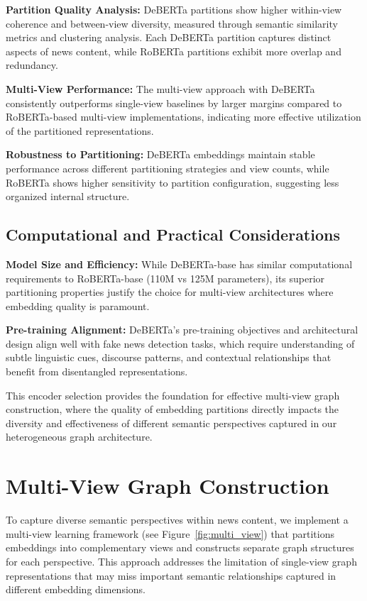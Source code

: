 \textbf{Partition Quality Analysis:} DeBERTa partitions show higher within-view coherence and between-view diversity, measured through semantic similarity metrics and clustering analysis. Each DeBERTa partition captures distinct aspects of news content, while RoBERTa partitions exhibit more overlap and redundancy.

\textbf{Multi-View Performance:} The multi-view approach with DeBERTa consistently outperforms single-view baselines by larger margins compared to RoBERTa-based multi-view implementations, indicating more effective utilization of the partitioned representations.

\textbf{Robustness to Partitioning:} DeBERTa embeddings maintain stable performance across different partitioning strategies and view counts, while RoBERTa shows higher sensitivity to partition configuration, suggesting less organized internal structure.

\subsection{Computational and Practical Considerations}

\textbf{Model Size and Efficiency:} While DeBERTa-base has similar computational requirements to RoBERTa-base (110M vs 125M parameters), its superior partitioning properties justify the choice for multi-view architectures where embedding quality is paramount.

\textbf{Pre-training Alignment:} DeBERTa's pre-training objectives and architectural design align well with fake news detection tasks, which require understanding of subtle linguistic cues, discourse patterns, and contextual relationships that benefit from disentangled representations.

This encoder selection provides the foundation for effective multi-view graph construction, where the quality of embedding partitions directly impacts the diversity and effectiveness of different semantic perspectives captured in our heterogeneous graph architecture.

\section{Multi-View Graph Construction}

To capture diverse semantic perspectives within news content, we implement a multi-view learning framework (see Figure~\ref{fig:multi_view}) that partitions embeddings into complementary views and constructs separate graph structures for each perspective. This approach addresses the limitation of single-view graph representations that may miss important semantic relationships captured in different embedding dimensions.

